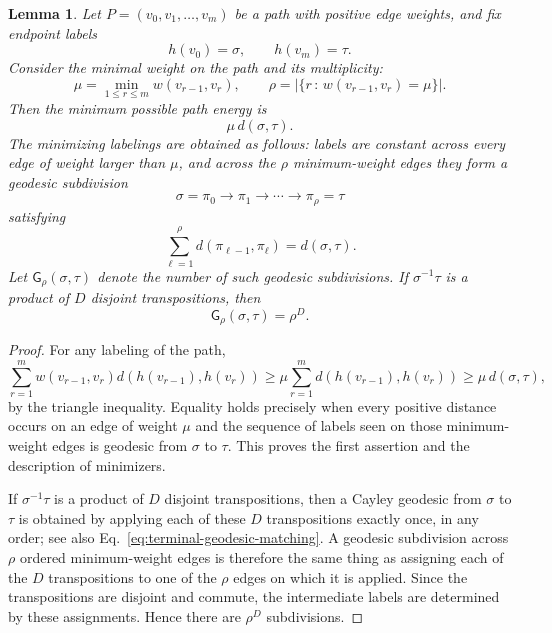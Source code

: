 \documentclass[11pt,oneside,letterpaper]{article}
\numberwithin{equation}{section}
\newtheorem{lemma}[theorem]{Lemma}
\theoremstyle{definition}
\theoremstyle{remark}
\begin{document}
\begin{lemma}
  \label{lem:weighted-path-geodesic-count}
  Let $P=(v_0,v_1,\ldots,v_m)$ be a path with positive edge weights, and fix endpoint labels
  \begin{equation}
    h(v_0)=\sigma,\qquad h(v_m)=\tau.
  \end{equation}
  Consider the minimal weight on the path and its multiplicity:
  \begin{equation}
    \mu=\min_{1\le r\le m}w(v_{r-1},v_r),\qquad
    \rho=|\{r \, : \, w(v_{r-1},v_r)=\mu\}|.
  \end{equation}
  Then the minimum possible path energy is
  \begin{equation}
    \mu\,d(\sigma,\tau).
  \end{equation}
  The minimizing labelings are obtained as follows: labels are constant
  across every edge of weight larger than $\mu$, and across the $\rho$
  minimum-weight edges they form a geodesic subdivision
  \begin{equation}
    \sigma=\pi_0 \to \pi_1 \to \cdots \to \pi_\rho=\tau
  \end{equation}
  satisfying
  \begin{equation}
    \sum_{\ell=1}^{\rho}d(\pi_{\ell-1},\pi_\ell)=d(\sigma,\tau).
  \end{equation}
  Let $\mathsf G_\rho(\sigma,\tau)$ denote the number of such geodesic
  subdivisions.  If $\sigma^{-1}\tau$ is a product of $D$ disjoint
  transpositions, then
  \begin{equation}
    \label{eq:path-geodesic-count-involution}
    \mathsf G_\rho(\sigma,\tau)=\rho^D.
  \end{equation}
\end{lemma}
\begin{proof}
  For any labeling of the path,
  \begin{equation}
    \sum_{r=1}^m w(v_{r-1},v_r)d(h(v_{r-1}),h(v_r))
    \ge
    \mu\sum_{r=1}^m d(h(v_{r-1}),h(v_r))
    \ge
    \mu\,d(\sigma,\tau),
  \end{equation}
  by the triangle inequality.  Equality holds precisely when every
  positive distance occurs on an edge of weight $\mu$ and the sequence of
  labels seen on those minimum-weight edges is geodesic from $\sigma$ to
  $\tau$.  This proves the first assertion and the description of
  minimizers.

  If $\sigma^{-1}\tau$ is a product of $D$ disjoint transpositions, then
  a Cayley geodesic from $\sigma$ to $\tau$ is obtained by applying each
  of these $D$ transpositions exactly once, in any order; see also Eq.~\eqref{eq:terminal-geodesic-matching}.  A geodesic
  subdivision across $\rho$ ordered minimum-weight edges is therefore the
  same thing as assigning each of the $D$ transpositions to one of the
  $\rho$ edges on which it is applied.  Since the transpositions are
  disjoint and commute, the intermediate labels are determined by these
  assignments.  Hence there are $\rho^D$ subdivisions.
\end{proof}
\end{document}
